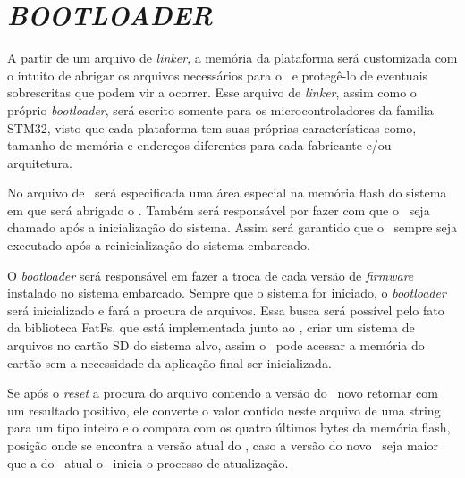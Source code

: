 



\section{\textit{BOOTLOADER}}
\label{sec:Bootloader}

A partir de um arquivo de \textit{linker}, a memória da plataforma será customizada com o intuito de abrigar os arquivos necessários para o \bootloader\ e protegê-lo de eventuais sobrescritas que podem vir a ocorrer. Esse arquivo de \textit{linker}, assim como o próprio \textit{bootloader}, será escrito somente para os microcontroladores da familia STM32, visto que cada plataforma tem suas próprias características como, tamanho de memória e endereços diferentes para cada fabricante e/ou arquitetura.

No arquivo de \linker\ será especificada uma área especial na memória flash do sistema em que será abrigado o \bootloader. Também será responsável por fazer com que o \bootloader\ seja chamado após a inicialização do sistema. Assim será garantido que o \bootloader\ sempre seja executado após a reinicialização do sistema embarcado.


O \textit{bootloader} será responsável em fazer a troca de cada versão de \textit{firmware} instalado no sistema embarcado. Sempre que o sistema for iniciado, o \textit{bootloader} será inicializado e fará a procura de arquivos. Essa busca será possível pelo fato da biblioteca FatFs, que está implementada junto ao \bootloader, criar um sistema de arquivos no cartão SD do sistema alvo, assim o \bootloader\ pode acessar a memória do cartão sem a necessidade da aplicação final ser inicializada.

Se após o \textit{reset} a procura do arquivo contendo a versão do \firmware\ novo retornar com um resultado positivo, ele converte o valor contido neste arquivo de uma string para um tipo inteiro e o compara com os quatro últimos bytes da memória flash, posição onde se encontra a versão atual do \firmware , caso a versão do novo \firmware\ seja maior que a do \firmware\ atual o \bootloader\ inicia o processo de atualização.

